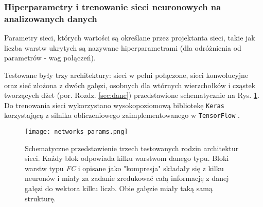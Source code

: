 \subsubsection*{Hiperparametry i trenowanie sieci neuronowych na analizowanych danych}

Parametry sieci, których wartości są określane przez projektanta sieci, takie jak liczba warstw ukrytych są nazywane hiperparametrami (dla odróżnienia od parametrów - wag połączeń).

Testowane były trzy architektury: sieci w pełni połączone, sieci konwolucyjne oraz sieć złożona z dwóch gałęzi, osobnych dla wtórnych wierzchołków i cząstek tworzących dżet (por. Rozdz. \ref{sec:dane}) przedstawione schematycznie na Rys. \ref{fig:nets-params}.
Do trenowania sieci wykorzystano wysokopoziomową bibliotekę \texttt{Keras} \cite{chollet15} korzystającą z silnika obliczeniowego zaimplementowanego w \texttt{TensorFlow} \cite{tensorflow15}.

\begin{figure}[h]
	\centering
	\texttt{[image: networks\_params.png]}
	\caption{Schematyczne przedstawienie trzech testowanych rodzin architektur sieci. Każdy blok odpowiada kilku warstwom danego typu. Bloki warstw typu \textit{FC}  i opisane jako "kompresja" składały się z kilku neuronów i miały za zadanie zredukować całą informację z danej gałęzi do wektora kilku liczb. Obie gałęzie miały taką samą strukturę.}
	\label{fig:nets-params}
\end{figure}


